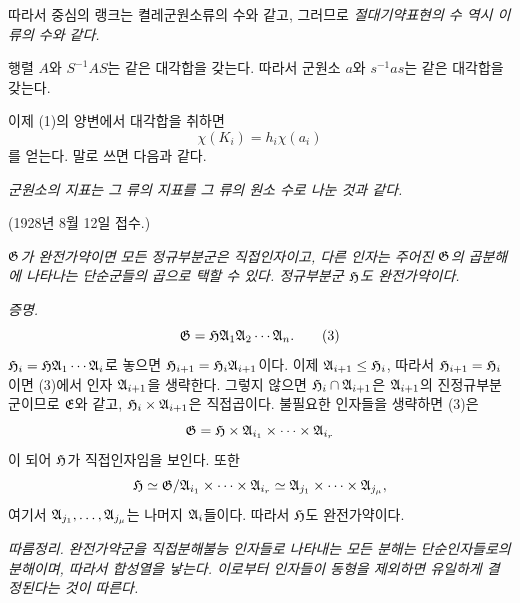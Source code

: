 따라서 중심의 랭크는 켤레군원소류의 수와 같고, 그러므로 \emph{절대기약표현의 수 역시 이 류의 수와 같다.}

행렬 \(A\)와 \(S^{-1}AS\)는 같은 대각합을 갖는다. 따라서 군원소 \(a\)와 \(s^{-1}as\)는 같은 대각합을 갖는다.

이제 (1)의 양변에서 대각합을 취하면
\[
        \chi(K_i)=h_i\chi(a_i)
\]
를 얻는다. 말로 쓰면 다음과 같다.

\noindent\emph{군원소의 지표는 그 류의 지표를 그 류의 원소 수로 나눈 것과 같다.}

\begin{center}
(1928년 8월 12일 접수.)
\end{center}

\emph{\(\mathfrak G\)가 완전가약이면 모든 정규부분군은 직접인자이고, 다른 인자는 주어진 \(\mathfrak G\)의 곱분해에 나타나는 단순군들의 곱으로 택할 수 있다. 정규부분군 \(\mathfrak H\)도 완전가약이다.}

\emph{증명.} 
\begin{equation}
        \mathfrak G=\mathfrak H\mathfrak A_1\mathfrak A_2\cdots\mathfrak A_n. \tag{3}
\end{equation}
\(\mathfrak H_i=\mathfrak H\mathfrak A_1\cdots\mathfrak A_i\)로 놓으면 \(\mathfrak H_{i+1}=\mathfrak H_i\mathfrak A_{i+1}\)이다. 이제 \(\mathfrak A_{i+1}\le\mathfrak H_i\), 따라서 \(\mathfrak H_{i+1}=\mathfrak H_i\)이면 (3)에서 인자 \(\mathfrak A_{i+1}\)을 생략한다. 그렇지 않으면 \(\mathfrak H_i\cap\mathfrak A_{i+1}\)은 \(\mathfrak A_{i+1}\)의 진정규부분군이므로 \(\mathfrak E\)와 같고, \(\mathfrak H_i\times\mathfrak A_{i+1}\)은 직접곱이다. 불필요한 인자들을 생략하면 (3)은
\[
        \mathfrak G=\mathfrak H\times\mathfrak A_{i_1}\times\cdots\times\mathfrak A_{i_r}
\]
이 되어 \(\mathfrak H\)가 직접인자임을 보인다. 또한
\[
        \mathfrak H\simeq
        \mathfrak G/\mathfrak A_{i_1}\times\cdots\times\mathfrak A_{i_r}
        \simeq
        \mathfrak A_{j_1}\times\cdots\times\mathfrak A_{j_\mu},
\]
여기서 \(\mathfrak A_{j_1},\ldots,\mathfrak A_{j_\mu}\)는 나머지 \(\mathfrak A_i\)들이다. 따라서 \(\mathfrak H\)도 완전가약이다.

\emph{따름정리.} \emph{완전가약군을 직접분해불능 인자들로 나타내는 모든 분해는 단순인자들로의 분해이며, 따라서 합성열을 낳는다. 이로부터 인자들이 동형을 제외하면 유일하게 결정된다는 것이 따른다.}
